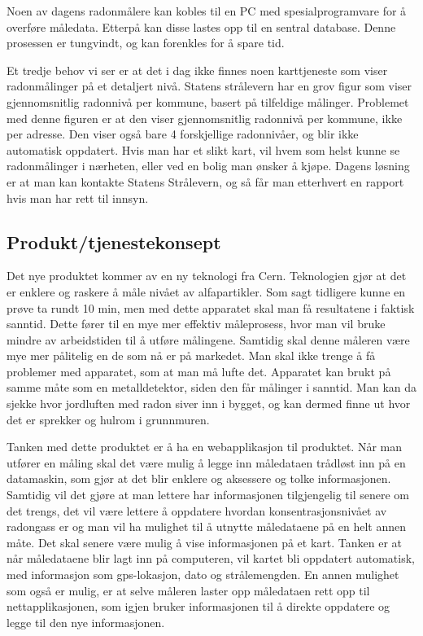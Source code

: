 Noen av dagens radonmålere kan kobles til en PC med spesialprogramvare for å overføre måledata. Etterpå kan disse lastes opp til en sentral database. Denne prosessen er tungvindt, og kan forenkles for å spare tid.

Et tredje behov vi ser er at det i dag ikke finnes noen karttjeneste som viser radonmålinger på et detaljert nivå. Statens strålevern har en grov figur som viser gjennomsnitlig radonnivå per kommune, basert på tilfeldige målinger. Problemet med denne figuren er at den viser gjennomsnitlig radonnivå per kommune, ikke per adresse. Den viser også bare 4 forskjellige radonnivåer, og blir ikke automatisk oppdatert. Hvis man har et slikt kart, vil hvem som helst kunne se radonmålinger i nærheten, eller ved en bolig man ønsker å kjøpe. Dagens løsning er at man kan kontakte Statens Strålevern, og så får man etterhvert en rapport hvis man har rett til innsyn.



\subsection{Produkt/tjenestekonsept}

Det nye produktet kommer av en ny teknologi fra Cern. Teknologien gjør at det er enklere og raskere å måle nivået av alfapartikler. Som sagt tidligere kunne en prøve ta rundt 10 min, men med dette apparatet skal man få resultatene i faktisk sanntid. Dette fører til en mye mer effektiv måleprosess, hvor man vil bruke mindre av arbeidstiden til å utføre målingene. Samtidig skal denne måleren være mye mer pålitelig en de som nå er på markedet. Man skal ikke trenge å få problemer med apparatet, som at man må lufte det. Apparatet kan brukt på samme måte som en metalldetektor, siden den får målinger i sanntid. Man kan da sjekke hvor jordluften med radon siver inn i bygget, og kan dermed finne ut hvor det er sprekker og hulrom i grunnmuren.

Tanken med dette produktet er å ha en webapplikasjon til produktet. Når man utfører en måling skal det være mulig å legge inn måledataen trådløst inn på en datamaskin, som gjør at det blir enklere og aksessere og tolke informasjonen. Samtidig vil det gjøre at man lettere har informasjonen tilgjengelig til senere om det trengs, det vil være lettere å oppdatere hvordan konsentrasjonsnivået av radongass er og man vil ha mulighet til å utnytte måledataene på en helt annen måte. Det skal senere være mulig å vise informasjonen på et kart. Tanken er at når måledataene blir lagt inn på computeren, vil kartet bli oppdatert automatisk, med informasjon som gps-lokasjon, dato og strålemengden. En annen mulighet som også er mulig, er at selve måleren laster opp måledataen rett opp til nettapplikasjonen, som igjen bruker informasjonen til å direkte oppdatere og legge til den nye informasjonen.
